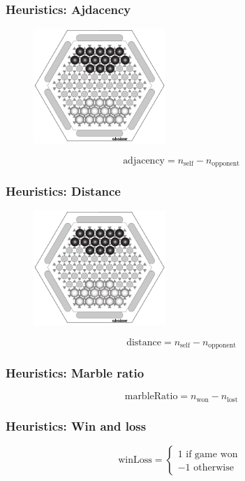 \documentclass{beamer}
\begin{document}
\begin{frame}
	\frametitle{Heuristics: Ajdacency}
	\begin{figure}
		\centering
		\includegraphics[width=5cm, keepaspectratio]{rules_starting_position.png}
	\end{figure}
	$$ \text{adjacency} = n_{\text{self}} - n_{\text{opponent}} $$
\end{frame}

\begin{frame}
	\frametitle{Heuristics: Distance}
	\begin{figure}
		\centering
		\includegraphics[width=5cm, keepaspectratio]{rules_starting_position.png}
	\end{figure}
	$$ \text{distance} = n_{\text{self}} - n_{\text{opponent}} $$
\end{frame}

\begin{frame}
	\frametitle{Heuristics: Marble ratio}
	$$ \text{marbleRatio} = n_{\text{won}} - n_{\text{lost}} $$

\end{frame}

\begin{frame}
	\frametitle{Heuristics: Win and loss}
	$$ \text{winLoss} =
		\begin{cases}
			1 \text{ if game won } \\
			-1 \text{ otherwise}
		\end{cases}
	$$

\end{frame}
\end{document}
